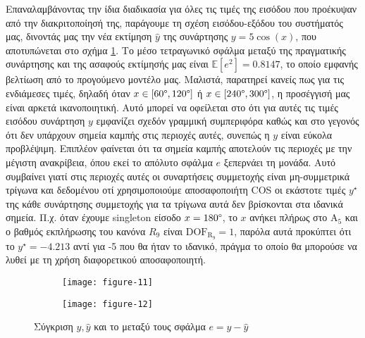 \documentclass[11pt,a4paper,titlepage, oneside]{article}
\begin{document}
	Επαναλαμβάνοντας την ίδια διαδικασία για όλες τις τιμές της εισόδου που προέκυψαν από την διακριτοποίησή της, παράγουμε τη σχέση εισόδου-εξόδου του συστήματός μας, δινοντάς μας την νέα εκτίμηση $\hat{y}$ της συνάρτησης $y = 5 \cos(x)$, που αποτυπώνεται στο σχήμα \ref{fig:xy_relations_2}. Το μέσο τετραγωνικό σφάλμα μεταξύ της πραγματικής συνάρτησης και της ασαφούς εκτίμησής μας είναι $\mathbb{E}[e^2] = 0.8147$, το οποίο εμφανής βελτίωση από το προγούμενο μοντέλο μας. Μαλιστά, παρατηρεί κανείς πως για τις ενδιάμεσες τιμές, δηλαδή όταν $x \in [60\degree, 120\degree]$ ή $x \in [240\degree, 300\degree]$, η προσέγγισή μας είναι αρκετά ικανοποιητική. Αυτό μπορεί να οφείλεται στο ότι για αυτές τις τιμές εισόδου συνάρτηση $y$ εμφανίζει σχεδόν γραμμική συμπεριφόρα καθώς και στο γεγονός ότι δεν υπάρχουν σημεία καμπής στις περιοχές αυτές, συνεπώς η $y$ είναι εύκολα προβλέψιμη. Επιπλέον φαίνεται ότι τα σημεία καμπής αποτελούν τις περιοχές με την μέγιστη ανακρίβεια, όπου εκεί το απόλυτο σφάλμα $e$ ξεπερνάει τη μονάδα. Αυτό συμβαίνει γιατί στις περιοχές αυτές οι συναρτήσεις συμμετοχής είναι μη-συμμετρικά τρίγωνα και δεδομένου οτί χρησιμοποιούμε αποσαφοποιήτη COS οι εκάστοτε τιμές $y^\star$ της κάθε συνάρτησης συμμετοχής για τα τρίγωνα αυτά δεν βρίσκονται στα ιδανικά σημεία. Π.χ. όταν έχουμε singleton είσοδο $x = 180\degree$, το $x$ ανήκει πλήρως στο $\text{A}_5$ και ο βαθμός εκπλήρωσης του κανόνα $R_9$ είναι $\text{DOF}_{\text{R}_9} = 1$, παρόλα αυτά προκύπτει ότι το $y^\star = -4.213$ αντί για -5 που θα ήταν το ιδανικό, πράγμα το οποίο θα μπορούσε να λυθεί με τη χρήση διαφορετικού αποσαφοποιητή.

	\begin{figure}
		\centering
		\begin{subfigure}[c]{0.495\textwidth}
			\texttt{[image: figure-11]}
		\end{subfigure}
		\begin{subfigure}[c]{0.495\textwidth}
			\texttt{[image: figure-12]}
		\end{subfigure}
		\caption{Σύγκριση $y, \hat{y}$ και το μεταξύ τους σφάλμα $e = y - \hat{y}$}
		\label{fig:xy_relations_2}
	\end{figure}
\end{document}
